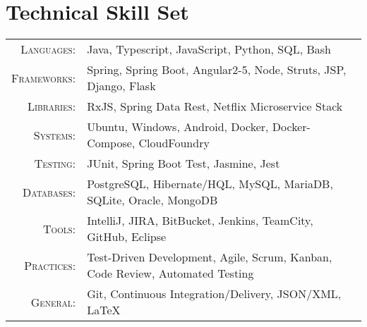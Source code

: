 \section{Technical Skill Set}
\begin{tabular}{r|p{11cm}}
	\textsc{Languages}: & Java, Typescript, JavaScript, Python, SQL, Bash \\
	\textsc{Frameworks}: & Spring, Spring Boot, Angular2-5, Node, Struts, JSP, Django, Flask \\
	\textsc{Libraries}: & RxJS, Spring Data Rest, Netflix Microservice Stack \\
	\textsc{Systems}: & Ubuntu, Windows, Android, Docker, Docker-Compose, CloudFoundry \\
	\textsc{Testing}: & JUnit, Spring Boot Test, Jasmine, Jest \\
	\textsc{Databases}: & PostgreSQL, Hibernate/HQL, MySQL, MariaDB, SQLite, Oracle, MongoDB \\
	\textsc{Tools}: & IntelliJ, JIRA, BitBucket, Jenkins, TeamCity, GitHub, Eclipse \\
	\textsc{Practices}: & Test-Driven Development, Agile, Scrum, Kanban, Code Review, Automated Testing \\
	\textsc{General}: & Git, Continuous Integration/Delivery, JSON/XML, LaTeX  \\
\end{tabular}